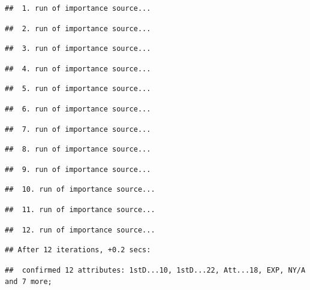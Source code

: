 \documentclass[
]{article}
\begin{document}
\begin{verbatim}
##  1. run of importance source...
\end{verbatim}

\begin{verbatim}
##  2. run of importance source...
\end{verbatim}

\begin{verbatim}
##  3. run of importance source...
\end{verbatim}

\begin{verbatim}
##  4. run of importance source...
\end{verbatim}

\begin{verbatim}
##  5. run of importance source...
\end{verbatim}

\begin{verbatim}
##  6. run of importance source...
\end{verbatim}

\begin{verbatim}
##  7. run of importance source...
\end{verbatim}

\begin{verbatim}
##  8. run of importance source...
\end{verbatim}

\begin{verbatim}
##  9. run of importance source...
\end{verbatim}

\begin{verbatim}
##  10. run of importance source...
\end{verbatim}

\begin{verbatim}
##  11. run of importance source...
\end{verbatim}

\begin{verbatim}
##  12. run of importance source...
\end{verbatim}

\begin{verbatim}
## After 12 iterations, +0.2 secs:
\end{verbatim}

\begin{verbatim}
##  confirmed 12 attributes: 1stD...10, 1stD...22, Att...18, EXP, NY/A and 7 more;
\end{verbatim}
\end{document}

